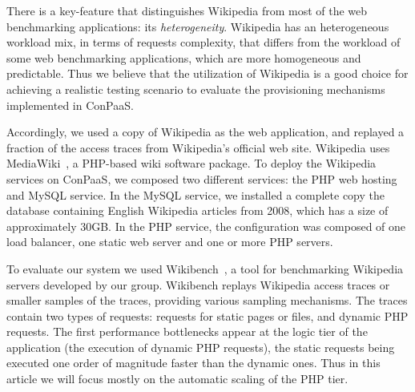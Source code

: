 

There is a key-feature that distinguishes Wikipedia from most of the web benchmarking applications: its \emph{heterogeneity}. Wikipedia has an heterogeneous workload mix, in terms of requests complexity, that differs from the workload of some web benchmarking applications, which are more homogeneous and predictable. Thus we believe that the utilization of Wikipedia is a good choice for achieving a realistic testing scenario to evaluate the provisioning mechanisms implemented in ConPaaS. 






Accordingly, we used a copy of Wikipedia as the web application, and replayed a fraction of the access traces from Wikipedia's official web site. Wikipedia uses MediaWiki~\cite{mediawiki}, a PHP-based wiki software package. 
To deploy the Wikipedia services on ConPaaS, we composed two different services: the PHP web hosting and MySQL service. In the MySQL service, we installed a complete copy the database containing English Wikipedia articles from 2008, which has a size of approximately 30GB.
In the PHP service, the configuration was composed of one load balancer,
one static web server and one or more PHP servers. 



To evaluate our system we used Wikibench~\cite{wikibench}, a tool for benchmarking Wikipedia 
servers developed by our group. Wikibench replays Wikipedia access
traces or smaller samples of the traces, providing various sampling
mechanisms. 
The traces contain two 
types of requests: requests for static pages or files, and dynamic
PHP requests. The first performance bottlenecks appear at the logic
tier of the application (the execution of dynamic PHP requests), the static 
requests being executed one order of magnitude faster than the dynamic 
ones. Thus in this article we will focus mostly on the automatic
scaling of the PHP tier.

